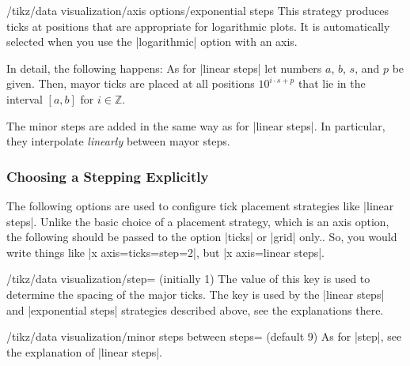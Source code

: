 \label{section-dv-exponential-strategy}

\begin{key}{/tikz/data visualization/axis options/exponential steps}
  This strategy produces ticks at positions that are appropriate for
  logarithmic plots. It is automatically selected when you use the
  |logarithmic| option with an axis.

  In detail, the following happens: As for |linear steps| let numbers
  $a$, $b$, $s$, and $p$ be given. Then, mayor ticks are placed at all
  positions $10^{i\cdot s+p}$ that lie in the interval $[a,b]$ for $i
  \in \mathbb Z$.

  The minor steps are added in the same way as for |linear steps|. In
  particular, they interpolate \emph{linearly} between mayor steps.

\begin{codeexample}[]
\end{codeexample}
\end{key}




\subsubsection{Choosing a Stepping Explicitly}

The following options are used to configure tick placement strategies
like |linear steps|. Unlike the basic choice of a placement strategy,
which is an axis option, the following should be passed to the option
|ticks| or |grid| only.. So, you would write
things like |x axis={ticks={step=2}}|, but |x axis=linear steps|.

\begin{key}{/tikz/data visualization/step= (initially 1)}
  The value of this key is used to determine the spacing of the major
  ticks. The key is used by the |linear steps| and |exponential steps|
  strategies described above, see the explanations there.
\end{key}

\begin{key}{/tikz/data visualization/minor steps between
    steps= (default 9)}
  As for |step|, see the explanation of |linear steps|.
\end{key}

